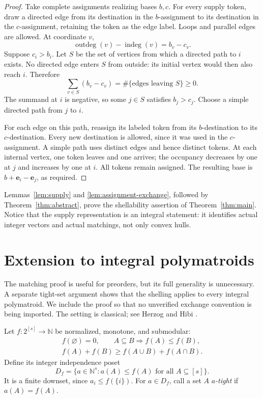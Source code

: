 \documentclass[11pt]{article}
\numberwithin{equation}{section}
\theoremstyle{definition}
\theoremstyle{remark}
\newcommand{\N}{\mathbb N}
\newcommand{\ee}{\mathbf e}
\begin{document}
\begin{proof}
Take complete assignments realizing bases $b,c$. For every supply token,
draw a directed edge from its destination in the $b$-assignment to its
destination in the $c$-assignment, retaining the token as the edge label.
Loops and parallel edges are allowed. At coordinate $v$,
\[
 \operatorname{outdeg}(v)-\operatorname{indeg}(v)=b_v-c_v.
\]
Suppose $c_i>b_i$. Let $S$ be the set of vertices from which a directed path
to $i$ exists. No directed edge enters $S$ from outside: its initial vertex
would then also reach $i$. Therefore
\[
 \sum_{v\in S}(b_v-c_v)
   =\#\{\text{edges leaving }S\}\ge0.
\]
The summand at $i$ is negative, so some $j\in S$ satisfies $b_j>c_j$.
Choose a simple directed path from $j$ to $i$.

For each edge on this path, reassign its labeled token from its
$b$-destination to its $c$-destination. Every new destination is allowed,
since it was used in the $c$-assignment. A simple path uses distinct edges
and hence distinct tokens. At each internal vertex, one token leaves and
one arrives; the occupancy decreases by one at $j$ and increases by one at
$i$. All tokens remain assigned. The resulting base is
$b+\ee_i-\ee_j$, as required.
\end{proof}

Lemmas~\ref{lem:supply} and \ref{lem:assignment-exchange}, followed by
Theorem~\ref{thm:abstract}, prove the shellability assertion of
Theorem~\ref{thm:main}. Notice that the supply representation is an integral
statement: it identifies actual integer vectors and actual matchings, not
only convex hulls.

\section{Extension to integral polymatroids}
\label{sec:polymatroids}

The matching proof is useful for preorders, but its full generality is
unnecessary. A separate tight-set argument shows that the shelling applies
to every integral polymatroid. We include the proof so that no unverified
exchange convention is being imported. The setting is classical; see
Herzog and Hibi \cite{HH}.

Let $f:2^{[s]}\to\N$ be normalized, monotone, and submodular:
\begin{equation}
 \begin{gathered}
 f(\varnothing)=0,\qquad
 A\subseteq B\Longrightarrow f(A)\le f(B),\\
 f(A)+f(B)\ge f(A\cup B)+f(A\cap B).
 \end{gathered}
 \label{eq:rank-function}
\end{equation}
Define its integer independence poset
\begin{equation}
 D_f=\{a\in\N^s:a(A)\le f(A)\text{ for all }A\subseteq[s]\}.
 \label{eq:integral-pm}
\end{equation}
It is a finite downset, since $a_i\le f(\{i\})$. For $a\in D_f$, call a set
$A$ \emph{$a$-tight} if $a(A)=f(A)$.
\end{document}
